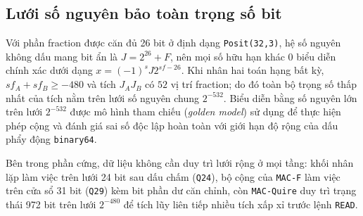\subsection{Lưới số nguyên bảo toàn trọng số bit}

Với phần fraction được căn đủ 26 bit ở định dạng \texttt{Posit(32,3)}, hệ số nguyên
không dấu mang bit ẩn là $J = 2^{26} + F$, nên mọi số hữu hạn khác 0 biểu diễn
chính xác dưới dạng $x = (-1)^s J 2^{sf - 26}$. Khi nhân hai toán hạng bất kỳ,
$sf_A + sf_B \ge -480$ và tích $J_A J_B$ có $52$ vị trí fraction; do đó toàn bộ
trọng số thấp nhất của tích nằm trên lưới số nguyên chung $2^{-532}$. Biểu diễn
bằng số nguyên lớn trên lưới $2^{-532}$ được mô hình tham chiếu (\textit{golden
model}) sử dụng để thực hiện phép cộng và đánh giá sai số độc lập hoàn toàn với
giới hạn độ rộng của dấu phẩy động \texttt{binary64}.

Bên trong phần cứng, dữ liệu không cần duy trì lưới rộng ở mọi tầng: khối nhân
lặp làm việc trên lưới 24 bit sau dấu chấm (\texttt{Q24}), bộ cộng của \texttt{MAC-F}
làm việc trên cửa sổ 31 bit (\texttt{Q29}) kèm bit phần dư căn chỉnh, còn
\texttt{MAC-Quire} duy trì trạng thái 972 bit trên lưới $2^{-480}$ để tích lũy
liên tiếp nhiều tích xấp xỉ trước lệnh \texttt{READ}.
